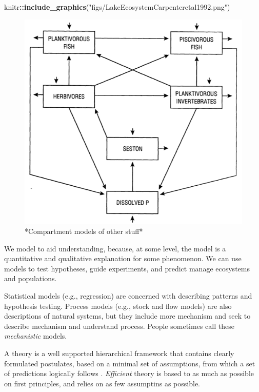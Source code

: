 \documentclass[
]{book}
\newenvironment{Shaded}{\begin{snugshade}}{\end{snugshade}}
\newcommand{\KeywordTok}[1]{\textcolor[rgb]{0.13,0.29,0.53}{\textbf{#1}}}
\newcommand{\NormalTok}[1]{#1}
\newcommand{\OperatorTok}[1]{\textcolor[rgb]{0.81,0.36,0.00}{\textbf{#1}}}
\newcommand{\StringTok}[1]{\textcolor[rgb]{0.31,0.60,0.02}{#1}}
\begin{document}
\begin{Shaded}
\begin{Highlighting}[]
\NormalTok{knitr}\OperatorTok{::}\KeywordTok{include_graphics}\NormalTok{(}\StringTok{"figs/LakeEcosystemCarpenteretal1992.png"}\NormalTok{)}
\end{Highlighting}
\end{Shaded}

\begin{figure}
\includegraphics[width=1\linewidth]{figs/LakeEcosystemCarpenteretal1992} \caption{*Compartment models of other stuff*}\label{fig:compartment2}
\end{figure}

We model to aid understanding, because, at some level, the model is a quantitative and qualitative explanation for some phenomenon. We can use models to test hypotheses, guide experiments, and predict manage ecosystems and populations.

Statistical models (e.g., regression) are concerned with describing patterns and hypothesis testing. Process models (e.g., stock and flow models) are also descriptions of natural systems, but they include more mechanism and seek to describe mechanism and understand process. People sometimes call these \emph{mechanistic} models.

A theory is a well supported hierarchical framework that contains clearly formulated postulates, based on a minimal set of assumptions, from which a set of predictions logically follows \citep{Marquet2014}. \emph{Efficient} theory is based to as much as possible on first principles, and relies on as few assumptins as possible.
\end{document}
